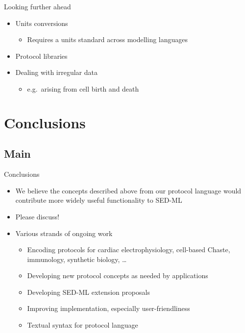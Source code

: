 \documentclass[t,xcolor={usenames,dvipsnames}]{beamer}
\newcommand{\subitem}[1]{\begin{itemize}[<.->]\item #1 \end{itemize}}
\begin{document}
\begin{frame}{Looking further ahead}
\begin{itemize}[<+->]
\item Units conversions
  \subitem{Requires a units standard across modelling languages}
\item Protocol libraries
\item Dealing with irregular data
  \subitem{e.g.\ arising from cell birth and death}
\end{itemize}
\end{frame}


\section{Conclusions}
\subsection*{Main}

\begin{frame}{Conclusions}
\begin{itemize}
\item We believe the concepts described above from our protocol
  language would contribute more widely useful functionality to SED-ML
\item Please discuss!
\item Various strands of ongoing work
  \begin{itemize}
  \item Encoding protocols for cardiac electrophysiology, cell-based Chaste, immunology, synthetic biology, \ldots
  \item Developing new protocol concepts as needed by applications
  \item Developing SED-ML extension proposals
  \item Improving implementation, especially user-friendliness
  \item Textual syntax for protocol language
  \end{itemize}
\end{itemize}
\end{frame}
\end{document}

